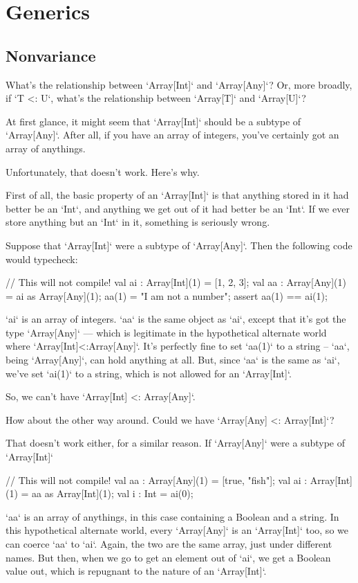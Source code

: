 \section{Generics}

\subsection{Nonvariance}
\label{sect:ArrayNonvariance}

What's the relationship between \xcd`Array[Int]` and \xcd`Array[Any]`?  Or,
more broadly, if \xcd`T <: U`, what's the relationship between \xcd`Array[T]`
and \xcd`Array[U]`?

At first glance, it might seem that \xcd`Array[Int]` should be a subtype of
\xcd`Array[Any]`.  After all, if you have an array of integers, you've
certainly got an array of anythings. 

Unfortunately, that doesn't work.  Here's why. 

First of all, the basic property of an \xcd`Array[Int]` is that anything
stored in it had better be an \xcd`Int`, and anything we get out of it had
better be an \xcd`Int`.  If we ever store anything but an
\xcd`Int` in it, something is seriously wrong.  

Suppose that \xcd`Array[Int]` were a subtype of \xcd`Array[Any]`.  Then the
following code would typecheck:
\begin{xten}
// This will not compile!
val ai : Array[Int](1) = [1, 2, 3];
val aa : Array[Any](1) = ai as Array[Any](1);
aa(1) = "I am not a number";
assert aa(1) == ai(1);
\end{xten}
\xcd`ai` is an array of integers.  \xcd`aa` is the same object as \xcd`ai`,
except that it's got the type \xcd`Array[Any]` --- which is legitimate in the
hypothetical alternate world where \xcd`Array[Int]<:Array[Any]`.  
It's perfectly fine to set \xcd`aa(1)` to a string -- \xcd`aa`, being
\xcd`Array[Any]`, can hold anything at all.  But, since \xcd`aa` is the same
as \xcd`ai`, we've set \xcd`ai(1)` to a string, which is not allowed for an
\xcd`Array[Int]`. 

So, we can't have \xcd`Array[Int] <: Array[Any]`.

How about the other way around.  Could we have \xcd`Array[Any] <: Array[Int]`?  

That doesn't work either, for a similar reason.   If 
\xcd`Array[Any]` were a subtype of \xcd`Array[Int]`
\begin{xten}
// This will not compile!
val aa : Array[Any](1) = [true, "fish"];
val ai : Array[Int](1) = aa as Array[Int](1);
val i  : Int = ai(0);
\end{xten}
\xcd`aa` is an array of anythings, in this case containing a Boolean and a
string. In this hypothetical alternate world, every \xcd`Array[Any]` is an
\xcd`Array[Int]` too, so we can coerce \xcd`aa` to \xcd`ai`. Again, the two
are the same array, just under different names.  But then, when
we go to get an element out of \xcd`ai`, we get a Boolean value out, which is
repugnant to the nature of an \xcd`Array[Int]`.  

